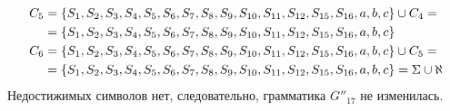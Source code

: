 \begin{itemize}
\begin{align*}
		      C_{5} & = \left\{S_1, S_2, S_3, S_4, S_5, S_6, S_7, S_8, S_9, S_{10}, S_{11}, S_{12}, S_{15}, S_{16}, a, b, c\right\} \cup C_{4} =         \\
		            & = \left\{S_1, S_2, S_3, S_4, S_5, S_6, S_7, S_8, S_9, S_{10}, S_{11}, S_{12}, S_{15}, S_{16}, a, b, c\right\}                      \\
		      C_{6} & = \left\{S_1, S_2, S_3, S_4, S_5, S_6, S_7, S_8, S_9, S_{10}, S_{11}, S_{12}, S_{15}, S_{16}, a, b, c\right\} \cup C_{5} =         \\
		            & = \left\{S_1, S_2, S_3, S_4, S_5, S_6, S_7, S_8, S_9, S_{10}, S_{11}, S_{12}, S_{15}, S_{16}, a, b, c\right\} = \Sigma \cup \aleph
	      \end{align*}
	      Недостижимых символов нет, следовательно, грамматика \(G''_{17}\) не изменилась.
\end{itemize}
